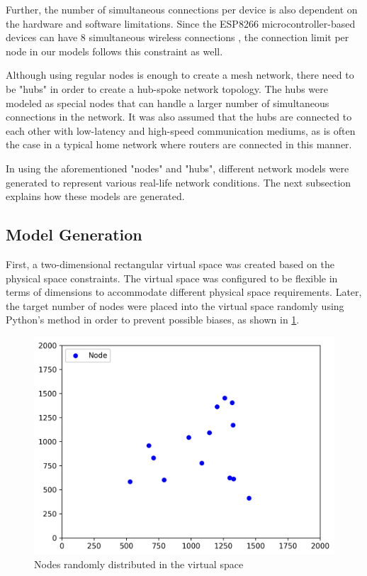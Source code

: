 Further, the number of simultaneous connections per device is also dependent on the hardware and software limitations. Since the ESP8266 microcontroller-based devices can have 8 simultaneous wireless connections \cite{ESP8266_NONOS_V1_1_0_Release_Notes}, the connection limit per node in our models follows this constraint as well.

Although using regular nodes is enough to create a mesh network, there need to be "hubs" in order to create a hub-spoke network topology. The hubs were modeled as special nodes that can handle a larger number of simultaneous connections in the network. It was also assumed that the hubs are connected to each other with low-latency and high-speed communication mediums, as is often the case in a typical home network where routers are connected in this manner. 

In using the aforementioned "nodes" and "hubs", different network models were generated to represent various real-life network conditions. The next subsection explains how these models are generated.


\newpage
\subsection{Model Generation}
\label{model-gen-section}
First, a two-dimensional rectangular virtual space was created based on the physical space constraints. The virtual space was configured to be flexible in terms of dimensions to accommodate different physical space requirements. Later, the target number of nodes were placed into the virtual space randomly using Python's  method in order to prevent possible biases, as shown in \ref{fig:modeling_node}.

\begin{figure}[H]
    \centering
    \includegraphics[width=0.5\columnwidth]{final-proposal/images/modeling_nodes_only.png}
    \caption{Nodes randomly distributed in the virtual space}
    \label{fig:modeling_node}
\end{figure}


